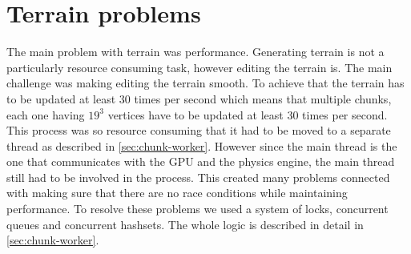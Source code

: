 \section{Terrain problems} \label{sec:terrain_problems}
The main problem with terrain was performance.
Generating terrain is not a particularly resource consuming task, however editing the terrain is.
The main challenge was making editing the terrain smooth.
To achieve that the terrain has to be updated at least 30 times per second which means that multiple chunks, each one having $19^3$ vertices have to be updated at least 30 times per second.
This process was so resource consuming that it had to be moved to a separate thread as described in \autoref{sec:chunk-worker}.
However since the main thread is the one that communicates with the GPU and the physics engine, the main thread still had to be involved in the process.
This created many problems connected with making sure that there are no race conditions while maintaining performance.
To resolve these problems we used a system of locks, concurrent queues and concurrent hashsets.
The whole logic is described in detail in \autoref{sec:chunk-worker}.